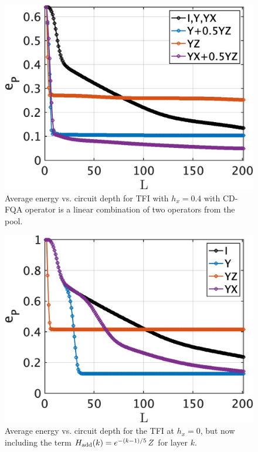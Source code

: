 \documentclass[twocolumn,aps,superscriptaddress,floatfix,longbibliography]{revtex4-2}
\begin{document}
\begin{figure}
    \centering
    \includegraphics[scale=0.185]{Lcomb.jpg}
    \caption{Average energy
   vs. circuit depth for TFI with  $h_x=0.4$ with CD-FQA operator is a linear combination of two operators from the pool.
   }
    \label{fig:Lcomb}
\end{figure}



\begin{figure}[tbh!]
\centering
\includegraphics[scale=0.185]{GHZ100_pert.jpg}
\caption{ %
   Average energy %
   vs. circuit depth for the TFI at $h_x=0$,
   but now including the  term
   $H_{\rm add}(k) %
   =e^{-(k-1)/5} \, Z$ for layer $k$. %
}\label{fig:GHZpert}
\end{figure}
\end{document}
